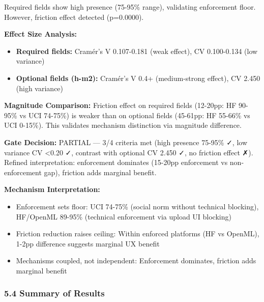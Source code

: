 Required fields show high presence (75-95\% range), validating enforcement floor. However, friction effect detected (p=0.0000).

\textbf{Effect Size Analysis:}
\begin{itemize}
\item \textbf{Required fields:} Cramér's V 0.107-0.181 (weak effect), CV 0.100-0.134 (low variance)
\item \textbf{Optional fields (h-m2):} Cramér's V 0.4+ (medium-strong effect), CV 2.450 (high variance)
\end{itemize}

\textbf{Magnitude Comparison:} Friction effect on required fields (12-20pp: HF 90-95\% vs UCI 74-75\%) is weaker than on optional fields (45-61pp: HF 55-66\% vs UCI 0-15\%). This validates mechanism distinction via magnitude difference.

\textbf{Gate Decision:} PARTIAL --- 3/4 criteria met (high presence 75-95\% ✓, low variance CV <0.20 ✓, contrast with optional CV 2.450 ✓, no friction effect ✗). Refined interpretation: enforcement dominates (15-20pp enforcement vs non-enforcement gap), friction adds marginal benefit.

\textbf{Mechanism Interpretation:}
\begin{itemize}
\item Enforcement sets floor: UCI 74-75\% (social norm without technical blocking), HF/OpenML 89-95\% (technical enforcement via upload UI blocking)
\item Friction reduction raises ceiling: Within enforced platforms (HF vs OpenML), 1-2pp difference suggests marginal UX benefit
\item Mechanisms coupled, not independent: Enforcement dominates, friction adds marginal benefit
\end{itemize}

\subsubsection{5.4 Summary of Results}

\begin{table}[htbp]
\centering
{}
\end{table}

